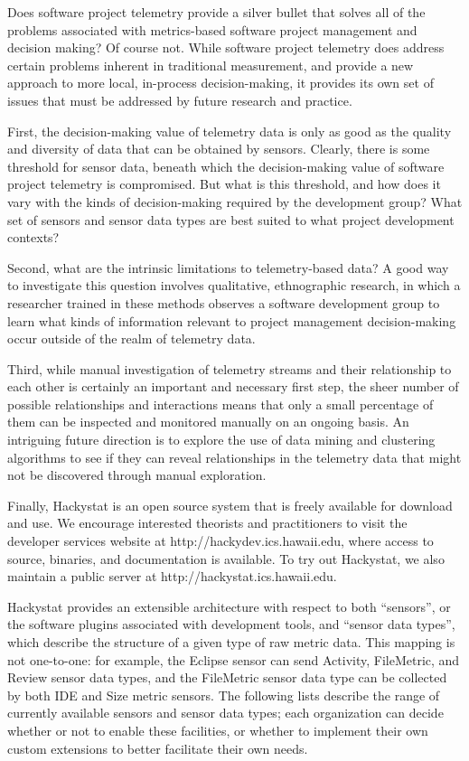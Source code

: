 \documentclass[11pt,twocolumn]{article}
\begin{document}

Does software project telemetry provide a silver bullet that solves all of
the problems associated with metrics-based software project management and
decision making?  Of course not.  While software project telemetry does
address certain problems inherent in traditional measurement, and provide a
new approach to more local, in-process decision-making, it provides its own
set of issues that must be addressed by future research and practice.

First, the decision-making value of telemetry data is only as good as the
quality and diversity of data that can be obtained by sensors. Clearly,
there is some threshold for sensor data, beneath which the decision-making
value of software project telemetry is compromised. But what is this
threshold, and how does it vary with the kinds of decision-making required
by the development group?  What set of sensors and sensor data types are
best suited to what project development contexts?

Second, what are the intrinsic limitations to telemetry-based data?
A good way to investigate this question involves qualitative, ethnographic
research, in which a researcher trained in these methods observes a
software development group to learn what kinds of information relevant to
project management decision-making occur outside of the realm of telemetry
data. 

Third, while manual investigation of telemetry streams and their
relationship to each other is certainly an important and necessary first
step, the sheer number of possible relationships and interactions means
that only a small percentage of them can be inspected and monitored
manually on an ongoing basis.  An intriguing future direction is to explore
the use of data mining and clustering algorithms to see if they can reveal
relationships in the telemetry data that might not be discovered through
manual exploration. 

Finally, Hackystat is an open source system that is freely available for
download and use. We encourage interested theorists and practitioners to
visit the developer services website at http://hackydev.ics.hawaii.edu,
where access to source, binaries, and documentation is available. To try out
Hackystat, we also maintain a public server at http://hackystat.ics.hawaii.edu.


\label{sec:Sidebar:Sensors}

Hackystat provides an extensible architecture with respect to both
``sensors'', or the software plugins associated with development tools, and
``sensor data types'', which describe the structure of a given type of raw
metric data.  This mapping is not one-to-one: for example, the Eclipse
sensor can send Activity, FileMetric, and Review sensor data types, and the
FileMetric sensor data type can be collected by both IDE and Size metric
sensors.   The following lists describe the range of currently available
sensors and sensor data types; each organization can decide whether or not
to enable these facilities, or whether to implement their own custom
extensions to better facilitate their own needs.
\end{document}
